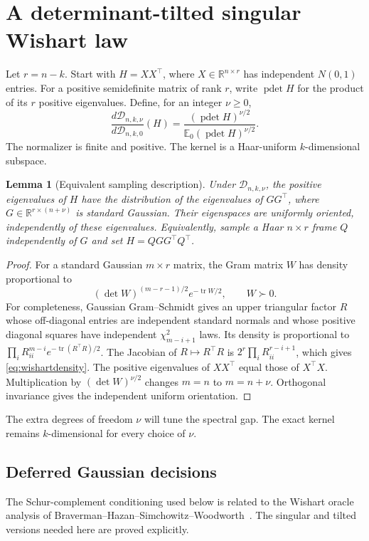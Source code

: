 \documentclass[11pt]{article}
\numberwithin{equation}{section}
\newtheorem{lemma}[theorem]{Lemma}
\theoremstyle{remark}\newtheorem{remark}[theorem]{Remark}
\newcommand{\R}{\mathbb R}
\newcommand{\E}{\mathbb E}
\newcommand{\tr}{\operatorname{tr}}
\newcommand{\pdet}{\operatorname{pdet}}
\newcommand{\calD}{\mathcal D}
\begin{document}
\section{A determinant-tilted singular Wishart law}\label{sec:prior}
Let $r=n-k$. Start with $H=XX^\top$, where $X\in\R^{n\times r}$ has independent $N(0,1)$ entries. For a positive semidefinite matrix of rank $r$, write $\pdet H$ for the product of its $r$ positive eigenvalues. Define, for an integer $\nu\ge0$,
\begin{equation}\label{eq:tilt}
\frac{d\calD_{n,k,\nu}}{d\calD_{n,k,0}}(H)
=\frac{(\pdet H)^{\nu/2}}{\E_0(\pdet H)^{\nu/2}}.
\end{equation}
The normalizer is finite and positive. The kernel is a Haar-uniform $k$-dimensional subspace.

\begin{lemma}[Equivalent sampling description]\label{lem:sampling}
Under $\calD_{n,k,\nu}$, the positive eigenvalues of $H$ have the distribution of the eigenvalues of $GG^\top$, where $G\in\R^{r\times(n+\nu)}$ is standard Gaussian. Their eigenspaces are uniformly oriented, independently of these eigenvalues. Equivalently, sample a Haar $n\times r$ frame $Q$ independently of $G$ and set $H=QGG^\top Q^\top$.
\end{lemma}
\begin{proof}
For a standard Gaussian $m\times r$ matrix, the Gram matrix $W$ has density proportional to
\begin{equation}\label{eq:wishartdensity}
(\det W)^{(m-r-1)/2}e^{-\tr W/2},\qquad W\succ0.
\end{equation}
For completeness, Gaussian Gram--Schmidt gives an upper triangular factor $R$ whose off-diagonal entries are independent standard normals and whose positive diagonal squares have independent $\chi^2_{m-i+1}$ laws. Its density is proportional to $\prod_iR_{ii}^{m-i}e^{-\tr(R^\top R)/2}$. The Jacobian of $R\mapsto R^\top R$ is $2^r\prod_iR_{ii}^{r-i+1}$, which gives \eqref{eq:wishartdensity}. The positive eigenvalues of $XX^\top$ equal those of $X^\top X$. Multiplication by $(\det W)^{\nu/2}$ changes $m=n$ to $m=n+\nu$. Orthogonal invariance gives the independent uniform orientation.
\end{proof}
The extra degrees of freedom $\nu$ will tune the spectral gap. The exact kernel remains $k$-dimensional for every choice of $\nu$.

\subsection{Deferred Gaussian decisions}
The Schur-complement conditioning used below is related to the Wishart oracle analysis of Braverman--Hazan--Simchowitz--Woodworth~\cite{bhsw}. The singular and tilted versions needed here are proved explicitly.
\end{document}
